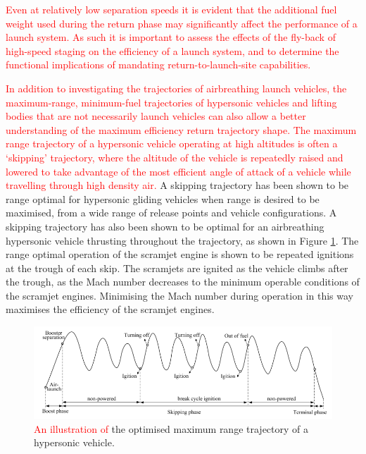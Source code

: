\textcolor{red}{Even at relatively low separation speeds it is evident that the additional fuel weight used during the return phase may significantly affect the performance of a launch system. As such it is important to assess the effects of the fly-back of high-speed staging on the efficiency of a launch system, and to determine the functional implications of mandating return-to-launch-site capabilities. }



\textcolor{red}{
	In addition to investigating the trajectories of airbreathing launch vehicles, the maximum-range, minimum-fuel trajectories of hypersonic vehicles and lifting bodies that are not necessarily launch vehicles can also allow a better understanding of the maximum efficiency return trajectory shape. The maximum range trajectory of a hypersonic vehicle operating at high altitudes is often a `skipping' trajectory, where the altitude of the vehicle is repeatedly raised and lowered to take advantage of the most efficient angle of attack of a vehicle while travelling through high density air\cite{Moshman2014,Darby2011,Toso2015,Chai2015,Pesch1980}.} A skipping trajectory has been shown to be range optimal for hypersonic gliding vehicles when range is desired to be maximised, from a wide range of release points and vehicle configurations\cite{Eggers1957,Moshman2014,Pesch1980,Moshman2014,Darby2011,Toso2015,Tetlow1992,Darby2011}. A skipping trajectory has also been shown to be optimal for an airbreathing hypersonic vehicle thrusting throughout the trajectory\cite{Kanda2007,Chai2015}, as shown in Figure \ref{fig:chai-boostskip}. The range optimal operation of the scramjet engine is shown to be repeated ignitions at the trough of each skip\cite{Chai2015}. The scramjets are ignited as the vehicle climbs after the trough, as the Mach number decreases to the minimum operable conditions of the scramjet engines\cite{Chai2015}. Minimising the Mach number during operation in this way maximises the efficiency of the scramjet engines\cite{Chai2015}.
\begin{figure}[ht]
	\centering
	\includegraphics[width=0.9\linewidth]{"figures/2_literature-review/chai-boost skip"}
	\caption{\textcolor{red}{An illustration of }the optimised maximum range trajectory of a hypersonic vehicle\cite{Chai2015}.}
	\label{fig:chai-boostskip}
\end{figure}

